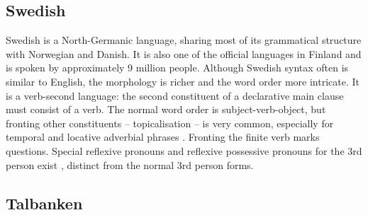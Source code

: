 \documentclass[runningheads,a4paper]{llncs}
\begin{document}
\subsection{Swedish}

Swedish is a North-Germanic language, sharing most of its grammatical structure 
with Norwegian and Danish. It is also one of the official languages in Finland
and is spoken by approximately 9 million people.
Although Swedish syntax often is similar to English, the  morphology is richer and the
word order more intricate.
It is a verb-second language: %
the second constituent of a declarative main clause must consist of a verb.
The normal word order is subject-verb-object, but fronting other constituents
-- topicalisation -- is very common,  especially for temporal and
locative adverbial phrases \cite[]{H&H}.
Fronting the finite verb marks questions.
Special reflexive pronouns and reflexive possessive pronouns for the 3rd
person exist \cite[ \& 319]{H&H}, distinct from the normal 3rd
person forms.






\subsection{Talbanken}
\end{document}
